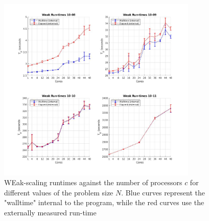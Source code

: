 \documentclass{article}
\begin{document}
\begin{figure}[H]
\centering
\includegraphics[width=0.85\textwidth]{weak_runtimes}
\caption{WEak-scaling runtimes against the number of processors $c$ for different values of the problem size $N$. Blue curves represent the "walltime" internal to the program, while the red curves use the externally measured run-time}
\label{weak_runtimes}
\end{figure}
\end{document}
